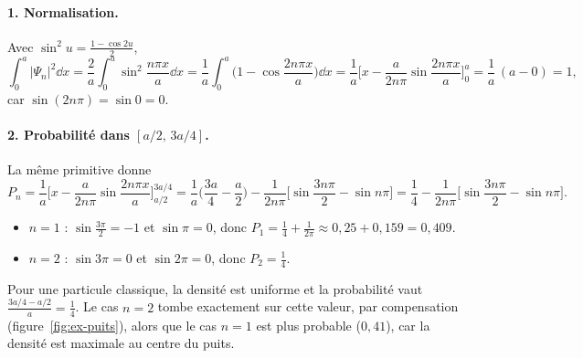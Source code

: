 \begin{correction}
\paragraph{1. Normalisation.} Avec $\sin^2u=\frac{1-\cos2u}{2}$,
\[
  \int_0^a|\Psi_n|^2\dd x=\frac2a\int_0^a\sin^2\frac{n\pi x}{a}\dd x
  =\frac1a\int_0^a\Big(1-\cos\frac{2n\pi x}{a}\Big)\dd x
  =\frac1a\Big[x-\frac{a}{2n\pi}\sin\frac{2n\pi x}{a}\Big]_0^a=\frac1a\,(a-0)=1,
\]
car $\sin(2n\pi)=\sin0=0$.

\paragraph{2. Probabilité dans $[a/2,\,3a/4]$.} La même primitive donne
\[
  P_n=\frac1a\Big[x-\frac{a}{2n\pi}\sin\frac{2n\pi x}{a}\Big]_{a/2}^{3a/4}
  =\frac1a\Big(\frac{3a}4-\frac a2\Big)-\frac{1}{2n\pi}\Big[\sin\frac{3n\pi}{2}-\sin n\pi\Big]
  =\frac14-\frac{1}{2n\pi}\Big[\sin\frac{3n\pi}{2}-\sin n\pi\Big].
\]
\begin{itemize}[nosep]
  \item $n=1$ : $\sin\frac{3\pi}{2}=-1$ et $\sin\pi=0$, donc
        $P_1=\tfrac14+\tfrac{1}{2\pi}\approx0{,}25+0{,}159=0{,}409$.
  \item $n=2$ : $\sin3\pi=0$ et $\sin2\pi=0$, donc $P_2=\tfrac14$.
\end{itemize}
Pour une particule classique, la densité est uniforme et la probabilité vaut $\frac{3a/4-a/2}{a}=\frac14$.
Le cas $n=2$ tombe exactement sur cette valeur, par compensation (figure~\ref{fig:ex-puits}), alors que
le cas $n=1$ est plus probable ($0{,}41$), car la densité est maximale au centre du puits.


\end{correction}
